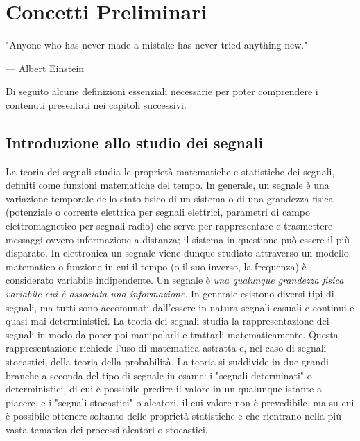 \documentclass[12pt,oneside,openany]{memoir}
\numberwithin{equation}{subsection}
\begin{document}
\chapter{Concetti Preliminari}
\epigraph{
	"Anyone who has never made a mistake has never tried anything new."
}{--- \textup{Albert Einstein}}

Di seguito alcune definizioni essenziali necessarie per poter comprendere i
contenuti presentati nei capitoli successivi.


\section{Introduzione allo studio dei segnali}
La teoria dei segnali studia le propriet\`a matematiche e statistiche dei
segnali, definiti come funzioni matematiche del tempo. In generale, un segnale
\`e una variazione temporale dello stato fisico di un sistema o di una grandezza
fisica (potenziale o corrente elettrica per segnali elettrici, parametri di
campo elettromagnetico per segnali radio) che serve per rappresentare e
trasmettere messaggi ovvero informazione a distanza; il sistema in questione
pu\`o essere il pi\`u disparato. In elettronica un segnale viene dunque studiato
attraverso un modello matematico o funzione in cui il tempo (o il suo inverso,
la frequenza) \`e considerato variabile indipendente.
\bigbreak
Un segnale \`e \textit{una qualunque grandezza fisica variabile cui \`e
associata una informazione}.
\bigbreak
In generale esistono diversi tipi di segnali, ma tutti sono accomunati
dall'essere in natura segnali casuali e continui e quasi mai deterministici. La
teoria dei segnali studia la rappresentazione dei segnali in modo da poter poi
manipolarli e trattarli matematicamente. Questa rappresentazione richiede l'uso
di matematica astratta e, nel caso di segnali stocastici, della teoria della
probabilit\`a.
\bigbreak
La teoria si suddivide in due grandi branche a seconda del tipo di segnale in
esame: i "segnali determinati" o deterministici, di cui è possibile predire il
valore in un qualunque istante a piacere, e i "segnali stocastici" o aleatori,
il cui valore non \`e prevedibile, ma su cui \`e possibile ottenere soltanto
delle propriet\`a statistiche e che rientrano nella pi\`u vasta tematica dei
processi aleatori o stocastici.
\bigbreak
\end{document}
